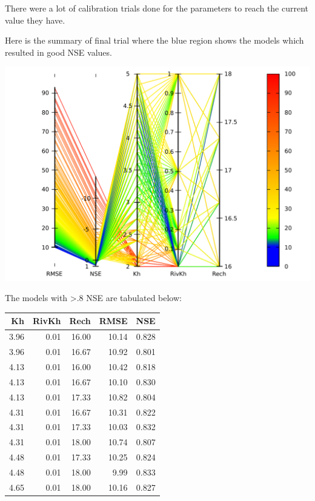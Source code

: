 \documentclass[titlepage,12pt]{unisubmission}
\begin{document}
There were a lot of calibration trials done for the parameters to reach the current value they have.

Here is the summary of final trial where the blue region shows the models which resulted in good NSE values.

\begin{center}
\includegraphics[width=.9\linewidth]{./images/4_calib-pp.pdf}
\end{center}

The models with >.8 NSE are tabulated below:

\begin{center}
\begin{tabular}{rrrrr}
\toprule
Kh & RivKh & Rech & RMSE & NSE\\
\midrule
3.96 & 0.01 & 16.00 & 10.14 & 0.828\\
3.96 & 0.01 & 16.67 & 10.92 & 0.801\\
4.13 & 0.01 & 16.00 & 10.42 & 0.818\\
4.13 & 0.01 & 16.67 & 10.10 & 0.830\\
4.13 & 0.01 & 17.33 & 10.82 & 0.804\\
4.31 & 0.01 & 16.67 & 10.31 & 0.822\\
4.31 & 0.01 & 17.33 & 10.03 & 0.832\\
4.31 & 0.01 & 18.00 & 10.74 & 0.807\\
4.48 & 0.01 & 17.33 & 10.25 & 0.824\\
4.48 & 0.01 & 18.00 & 9.99 & 0.833\\
4.65 & 0.01 & 18.00 & 10.16 & 0.827\\
\bottomrule
\end{tabular}
\end{center}
\end{document}
